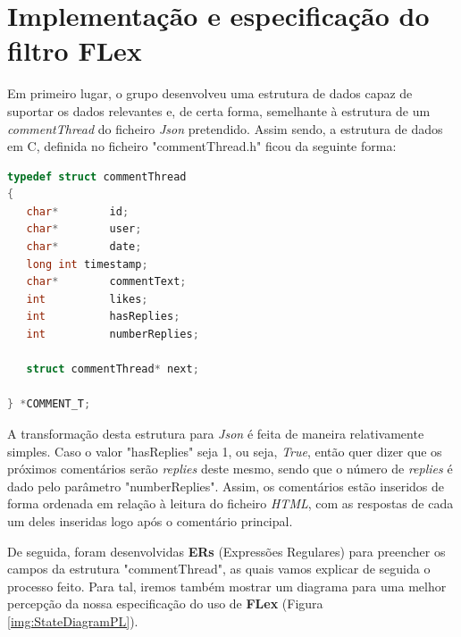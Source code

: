 \documentclass[a4paper,12pt]{report}
\begin{document}
\vspace{10cm}

\section{Implementação e especificação do filtro FLex}

\vspace{0.5cm}

Em primeiro lugar, o grupo desenvolveu uma estrutura de dados capaz de suportar os dados relevantes e, de certa forma, semelhante à estrutura de um \textit{commentThread} do ficheiro \textit{Json} pretendido. Assim sendo, a estrutura de dados em C, definida no ficheiro "commentThread.h" ficou da seguinte forma:


\begin{center}
\begin{lstlisting}[language = c]
typedef struct commentThread 
{
   char*        id;
   char*        user;
   char*        date;
   long int	timestamp;
   char*        commentText;
   int          likes;
   int          hasReplies;
   int          numberReplies;

   struct commentThread* next;

} *COMMENT_T;
    \end{lstlisting}
\end{center} 

\par A transformação desta estrutura para \textit{Json} é feita de maneira relativamente simples. Caso o valor "hasReplies" seja 1, ou seja, \textit{True}, então quer dizer que os próximos comentários serão \textit{replies} deste mesmo, sendo que o número de \textit{replies} é dado pelo parâmetro "numberReplies".
Assim, os comentários estão inseridos de forma ordenada em relação à leitura do ficheiro \textit{HTML}, com as respostas de cada um deles inseridas logo após o comentário principal.

\vspace{1cm}

\par De seguida, foram desenvolvidas \textbf{ERs} (Expressões Regulares) para preencher os campos da estrutura "commentThread", as quais vamos explicar de seguida o processo feito. Para tal, iremos também mostrar um diagrama para uma melhor percepção da nossa especificação do uso de \textbf{FLex} (Figura \ref{img:StateDiagramPL}).

\vspace{0.5cm}
\end{document}
